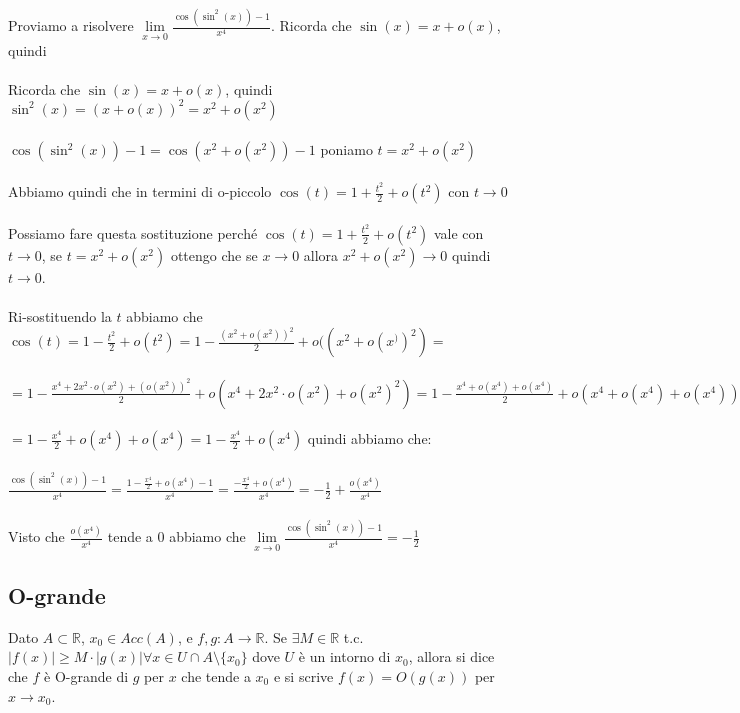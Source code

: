 \begin{example}
    Proviamo a risolvere $\lim\limits_{x\to 0}\frac{\cos(\sin^2(x)) - 1}{x^4}$. Ricorda che $\sin(x) = x + o(x)$, quindi \\\\
    Ricorda che $\sin(x) = x + o(x)$, quindi $\sin^2(x) = (x + o(x))^2 = x^2 + o(x^2)$ \\\\
    $\cos(\sin^2(x)) - 1 = \cos(x^2 + o(x^2)) - 1$ poniamo $t = x^2 + o(x^2)$\\\\
    Abbiamo quindi che in termini di o-piccolo $\cos(t) = 1 + \frac{t^2}{2} + o(t^2)$ con $t\to 0$\\\\
    Possiamo fare questa sostituzione perché $\cos(t) = 1 + \frac{t^2}{2} + o(t^2)$ vale con $t\to 0$, se $t = x^2 + o(x^2)$ ottengo che se $x\to 0$ allora $x^2 + o(x^2) \to 0$ quindi $t\to 0$.\\\\
    Ri-sostituendo la $t$ abbiamo che $\cos(t) = 1 - \frac{t^2}{2} + o(t^2) = 1 - \frac{(x^2 + o(x^2))^2}{2} + o((x^2 + o(x^))^2) =$\\\\
    $= 1 - \frac{x^4 + 2x^2 \cdot o(x^2) + (o(x^2))^2}{2} + o(x^4 + 2x^2 \cdot o(x^2) + o(x^2)^2) = 1 - \frac{x^4 + o(x^4) + o(x^4)}{2} + o(x^4 + o(x^4) + o(x^4)) =$\\\\
    $= 1 - \frac{x^4}{2} + o(x^4) + o(x^4) = 1 - \frac{x^4}{2} + o(x^4)$ quindi abbiamo che:\\\\
    $\frac{\cos(\sin^2(x)) - 1}{x^4} = \frac{1 - \frac{x^4}{2} + o(x^4) -1}{x^4} = \frac{-\frac{x^4}{2} + o(x^4)}{x^4} = -\frac{1}{2} + \frac{o(x^4)}{x^4}$\\\\
    Visto che $\frac{o(x^4)}{x^4}$ tende a 0 abbiamo che $\lim\limits_{x\to 0}\frac{\cos(\sin^2(x)) - 1}{x^4} = -\frac{1}{2}$
\end{example}

\subsection{O-grande}
\begin{definition}[O-grande]
    Dato $A \subset \mathbb{R}$, $x_0 \in Acc(A)$, e $f,g: A \to \mathbb{R}$. Se $\exists M \in \mathbb{R}$ t.c. $|f(x)| \geq M \cdot |g(x)|    \forall x \in U \cap A \setminus \{x_0\}$ dove $U$ è un intorno di $x_0$, allora si dice che $f$ è O-grande di $g$ per $x$ che tende a $x_0$ e si scrive $f(x) = O(g(x))$ per $x\to x_0$.
\end{definition}

